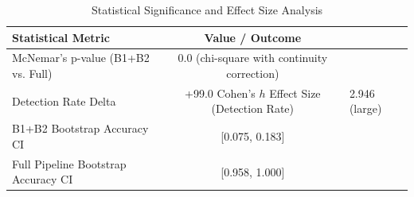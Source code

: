 \begin{table}[h]
\centering
\caption{Statistical Significance and Effect Size Analysis}
\label{tab:semantic_stats}
\begin{tabular}{lc}
\hline
\textbf{Statistical Metric} & \textbf{Value / Outcome} \\ \hline
McNemar's p-value (B1+B2 vs. Full) & 0.0 (chi-square with continuity correction) \\
Detection Rate Delta & +99.0%
Cohen's $h$ Effect Size (Detection Rate) & 2.946 (large) \\
B1+B2 Bootstrap Accuracy CI & [0.075, 0.183] \\
Full Pipeline Bootstrap Accuracy CI & [0.958, 1.000] \\
\hline
\end{tabular}
\end{table}
